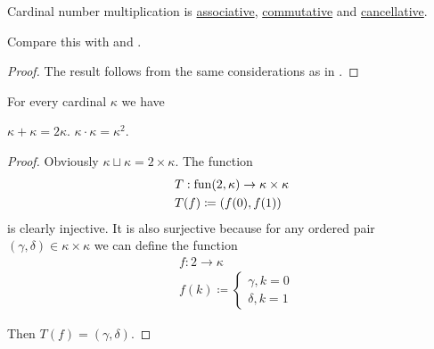 \begin{proposition}\label{thm:cardinal_multiplication_algebraic_properties}
  Cardinal number multiplication is \hyperref[def:magma/associative]{associative}, \hyperref[def:magma/associative]{commutative} and \hyperref[def:magma/cancellative]{cancellative}.

  Compare this with  and .
\end{proposition}
\begin{proof}
  The result follows from the same considerations as in .
\end{proof}

\begin{proposition}\label{thm:double_and_square_of_cardinal}
  For every cardinal \( \kappa \) we have
  \begin{thmenum}
     \( \kappa + \kappa = 2\kappa \).
     \( \kappa \cdot \kappa = \kappa^2 \).
  \end{thmenum}
\end{proposition}
\begin{proof}
   Obviously \( \kappa \sqcup \kappa = 2 \times \kappa \).
   The function
  \begin{equation*}
    \begin{aligned}
      &T: \operatorname{fun}(2, \kappa) \to \kappa \times \kappa \\
      &T(f) \coloneqq (f(0), f(1))
    \end{aligned}
  \end{equation*}
  is clearly injective. It is also surjective because for any ordered pair \( (\gamma, \delta) \in \kappa \times \kappa \) we can define the function
  \begin{equation*}
    \begin{aligned}
      &f: 2 \to \kappa \\
      &f(k) \coloneqq \begin{cases}
        \gamma, k = 0 \\
        \delta, k = 1
      \end{cases}
    \end{aligned}
  \end{equation*}

  Then \( T(f) = (\gamma, \delta) \).
\end{proof}

